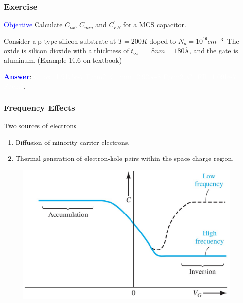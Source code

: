 \documentclass{beamer}
\begin{document}
    \begin{frame} \frametitle{Exercise}
        \par \textcolor{blue}{Objective} Calculate $C_{ox} $, $C^\prime_{min} $ and $C^\prime_{FB} $ for a MOS capacitor.
        \par Consider a p-type silicon substrate at $T = 200K$ doped to $N_a = 10^{16} cm^{-3}$. The oxide is silicon dioxide with a thickness of $t_{ox}  = 18nm = 180 $\r A, and the gate is aluminum. (Example 10.6 on textbook)
        \vspace{1em}
        \par \textbf{\textcolor{blue}{Answer}}: \textcolor{white}{C\_{ox}=1.9175e-7 F/cm\^2, C\_{min}=2.925e-8 F/cm\^2, C\_{FB}=1.091e-7 F/cm\^2}.
    \end{frame}

    \begin{frame} \frametitle{Frequency Effects}
        \par Two sources of electrons
        \begin{enumerate}[1.]
            \item Diffusion of minority carrier electrons.
            \item Thermal generation of electron-hole pairs within the space charge region.
        \end{enumerate}
        \begin{figure}[H]
            \centering
            \includegraphics[width=0.8\linewidth]{Frequency-effect.jpg}
            \label{fig:Frequency-effect.jpg}
        \end{figure}
    \end{frame}
\end{document}
